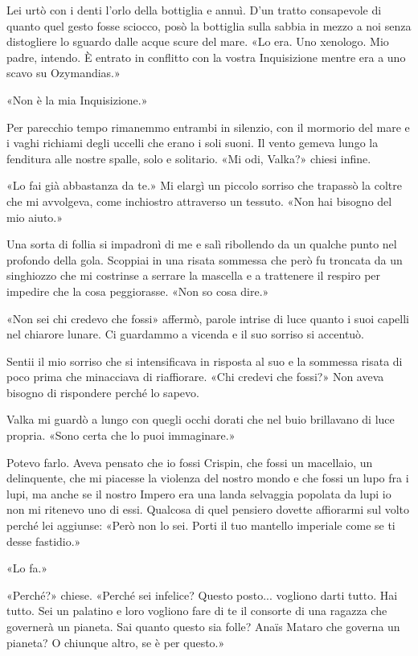 Lei urtò con i denti l'orlo della bottiglia e annuì. D'un tratto
consapevole di quanto quel gesto fosse sciocco, posò la bottiglia sulla
sabbia in mezzo a noi senza distogliere lo sguardo dalle acque scure del
mare. «Lo era. Uno xenologo. Mio padre, intendo. È entrato in conflitto
con la vostra Inquisizione mentre era a uno scavo su Ozymandias.»

«Non è la mia Inquisizione.»

Per parecchio tempo rimanemmo entrambi in silenzio, con il mormorio del
mare e i vaghi richiami degli uccelli che erano i soli suoni. Il vento
gemeva lungo la fenditura alle nostre spalle, solo e solitario. «Mi odi,
Valka?» chiesi infine.

«Lo fai già abbastanza da te.» Mi elargì un piccolo sorriso che trapassò
la coltre che mi avvolgeva, come inchiostro attraverso un tessuto. «Non
hai bisogno del mio aiuto.»

Una sorta di follia si impadronì di me e salì ribollendo da un qualche
punto nel profondo della gola. Scoppiai in una risata sommessa che però
fu troncata da un singhiozzo che mi costrinse a serrare la mascella e a
trattenere il respiro per impedire che la cosa peggiorasse. «Non so cosa
dire.»

«Non sei chi credevo che fossi» affermò, parole intrise di luce quanto i
suoi capelli nel chiarore lunare. Ci guardammo a vicenda e il suo
sorriso si accentuò.

Sentii il mio sorriso che si intensificava in risposta al suo e la
sommessa risata di poco prima che minacciava di riaffiorare. «Chi
credevi che fossi?» Non aveva bisogno di rispondere perché lo sapevo.

Valka mi guardò a lungo con quegli occhi dorati che nel buio brillavano
di luce propria. «Sono certa che lo puoi immaginare.»

Potevo farlo. Aveva pensato che io fossi Crispin, che fossi un
macellaio, un delinquente, che mi piacesse la violenza del nostro mondo
e che fossi un lupo fra i lupi, ma anche se il nostro Impero era una
landa selvaggia popolata da lupi io non mi ritenevo uno di essi.
Qualcosa di quel pensiero dovette affiorarmi sul volto perché lei
aggiunse: «Però non lo sei. Porti il tuo mantello imperiale come se ti
desse fastidio.»

«Lo fa.»

«Perché?» chiese. «Perché sei infelice? Questo posto... vogliono darti
tutto. Hai tutto. Sei un palatino e loro vogliono fare di te il
{consorte} di una ragazza che governerà un pianeta. Sai quanto questo
sia folle? Anaïs Mataro che governa un pianeta? O chiunque altro, se è
per questo.»

